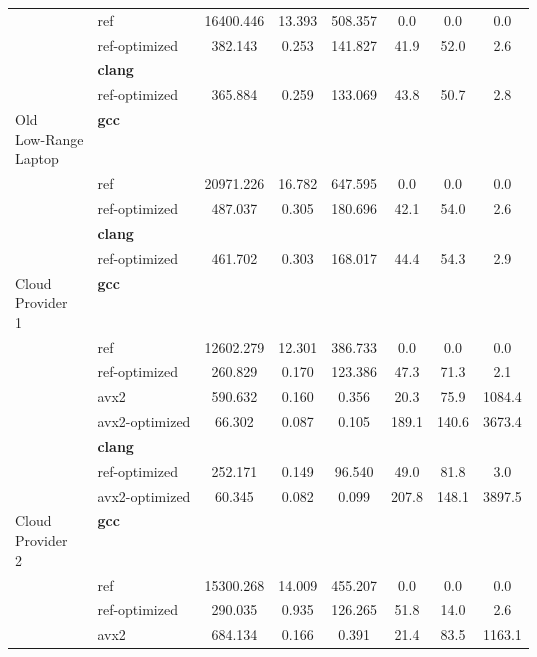 \begin{table}
\begin{tabularx}{\linewidth}{l l c c c c c c}
          & ref & 16400.446 & 13.393 & 508.357 & 0.0 & 0.0 & 0.0\\
          & ref-optimized & 382.143 & 0.253 & 141.827 & 41.9 & 52.0 & 2.6\\
          & \textbf{clang} & & & & & \\
          & ref-optimized & 365.884 & 0.259 & 133.069 & 43.8 & 50.7 & 2.8\\
          \midrule
          \multirowcell{5}{Old\\ Low-Range\\ Laptop}
          & \textbf{gcc} & & & & & \\
          & ref & 20971.226 & 16.782 & 647.595 & 0.0 & 0.0 & 0.0\\
          & ref-optimized & 487.037 & 0.305 & 180.696 & 42.1 & 54.0 & 2.6\\
          & \textbf{clang} & & & & & \\
          & ref-optimized & 461.702 & 0.303 & 168.017 & 44.4 & 54.3 & 2.9\\
          \midrule
          \multirowcell{8}{Cloud\\ Provider\\ 1}
          & \textbf{gcc} & & & & & \\
          & ref & 12602.279 & 12.301 & 386.733 & 0.0 & 0.0 & 0.0\\
          & ref-optimized & 260.829 & 0.170 & 123.386 & 47.3 & 71.3 & 2.1\\
          & avx2 & 590.632 & 0.160 & 0.356 & 20.3 & 75.9 & 1084.4\\
          & avx2-optimized & 66.302 & 0.087 & 0.105 & 189.1 & 140.6 & 3673.4\\
          & \textbf{clang} & & & & & \\
          & ref-optimized & 252.171 & 0.149 & 96.540 & 49.0 & 81.8 & 3.0\\
          & avx2-optimized & 60.345 & 0.082 & 0.099 & 207.8 & 148.1 & 3897.5\\
          \midrule
          \multirowcell{8}{Cloud\\ Provider\\ 2}
          & \textbf{gcc} & & & & & \\
          & ref & 15300.268 & 14.009 & 455.207 & 0.0 & 0.0 & 0.0\\
          & ref-optimized & 290.035 & 0.935 & 126.265 & 51.8 & 14.0 & 2.6\\
          & avx2 & 684.134 & 0.166 & 0.391 & 21.4 & 83.5 & 1163.1\\

\end{tabularx}
\end{table}
